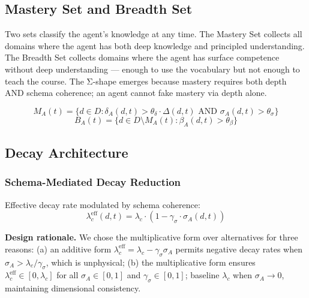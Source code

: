 \subsection{Mastery Set and Breadth Set}\label{sec:mastery-set}

Two sets classify the agent's knowledge at any time. The Mastery Set collects all domains where the agent has both deep knowledge and principled understanding. The Breadth Set collects domains where the agent has surface competence without deep understanding --- enough to use the vocabulary but not enough to teach the course. The Σ-shape emerges because mastery requires both depth AND schema coherence; an agent cannot fake mastery via depth alone.

\begin{equation}\label{eq:mastery-set}
M_A(t) = \{d \in D : \delta_A(d,t) > \theta_{\delta} \cdot \Delta(d,t) \text{ AND } \sigma_A(d,t) > \theta_{\sigma}\} %
\end{equation}
\begin{equation}\label{eq:breadth-set}
B_A(t) = \{d \in D \setminus M_A(t) : \beta_A(d,t) > \theta_{\beta}\}
\end{equation}

\subsection{Decay Architecture}\label{sec:decay}

\subsubsection{Schema-Mediated Decay Reduction}

Effective decay rate modulated by schema coherence:
\begin{equation}\label{eq:effective-decay}
\lambda_c^{\text{eff}}(d,t) = \lambda_c \cdot (1 - \gamma_\sigma \cdot \sigma_A(d,t))
\end{equation}

\textbf{Design rationale.} We chose the multiplicative form over alternatives
for three reasons: (a) an additive form $\lambda_c^{\text{eff}} = \lambda_c - \gamma_\sigma \sigma_A$
permits negative decay rates when $\sigma_A > \lambda_c / \gamma_\sigma$, which is
unphysical; (b) the multiplicative form ensures $\lambda_c^{\text{eff}} \in [0, \lambda_c]$
for all $\sigma_A \in [0,1]$ and $\gamma_\sigma \in [0,1]$; %
baseline $\lambda_c$ when $\sigma_A \to 0$, maintaining dimensional consistency.

